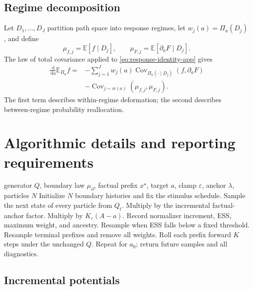 \documentclass{article}
\newcommand{\E}{\mathbb E}
\newcommand{\eps}{\varepsilon}
\newcommand{\dd}{\,\mathrm d}
\DeclareMathOperator{\Cov}{Cov}
\theoremstyle{remark}
\begin{document}
\subsection{Regime decomposition}
\label{app:regime-decomposition}

Let \(D_1,\ldots,D_J\) partition path space into response regimes, let
\(w_j(a)=\Pi_a(D_j)\), and define
\[
  \mu_{f,j}=\E[f\mid D_j],
  \qquad
  \mu_{F,j}=
  \E[\partial_aF\mid D_j].
\]
The law of total covariance applied to \cref{eq:response-identity-app} gives
\begin{equation}
\begin{split}
  \frac{\dd}{\dd a}\E_{\Pi_a}f
  ={}&
  -\sum_{j=1}^J
  w_j(a)
  \Cov_{\Pi_a(\cdot\mid D_j)}
  (f,\partial_aF)\\
  &-
  \Cov_{j\sim w(a)}
  (\mu_{f,j},\mu_{F,j}).
\end{split}
\label{eq:regime-decomposition-app}
\end{equation}
The first term describes within-regime deformation; the second describes
between-regime probability reallocation.

\section{Algorithmic details and reporting requirements}
\label{app:algorithm}

\begin{algorithm}[h]
\caption{Repaired-path sequential Monte Carlo}
\label{alg:smc-app}
\begin{algorithmic}[1]
\Require generator \(Q\), boundary law \(\mu_\partial\), factual prefix
\(x^\star\), target \(a\), clamp \(\eps\), anchor \(\lambda\), particles \(N\)
\State Initialize \(N\) boundary histories and fix the stimulus schedule.
  \State Sample the next state of every particle from \(Q_t\).
  \State Multiply by the incremental factual-anchor factor.
   \State Multiply by \(K_\eps(A-a)\). \EndIf
  \State Record normalizer increment, ESS, maximum weight, and ancestry.
  \State Resample when ESS falls below a fixed threshold.
\EndFor
\State Resample terminal prefixes and remove all weights.
\State Roll each prefix forward \(K\) steps under the unchanged \(Q\).
\State Repeat for \(a_0\); return future samples and all diagnostics.
\end{algorithmic}
\end{algorithm}

\subsection{Incremental potentials}
\end{document}
